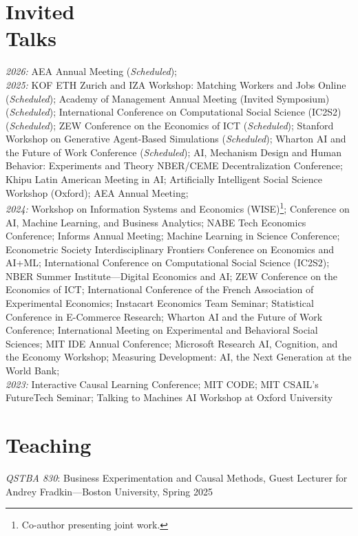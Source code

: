 \documentclass[margin,line,pifont,palatino,courier, 9pt]{res}
\begin{document}
\begin{resume}
\section{\sc Invited\\Talks}
\textit{2026:} 
AEA Annual Meeting (\textit{Scheduled});\vspace{2mm}\\
\textit{2025:} 
KOF ETH Zurich and IZA Workshop: Matching Workers and Jobs Online (\textit{Scheduled});
Academy of Management Annual Meeting (Invited Symposium) (\textit{Scheduled});
International Conference on Computational Social Science (IC2S2) (\textit{Scheduled});
ZEW Conference on the Economics of ICT (\textit{Scheduled});
Stanford Workshop on Generative Agent-Based Simulations (\textit{Scheduled});
Wharton AI and the Future of Work Conference (\textit{Scheduled});
AI, Mechanism Design and Human Behavior: Experiments and Theory NBER/CEME Decentralization Conference;
Khipu Latin American Meeting in AI;
Artificially Intelligent Social Science Workshop (Oxford);
AEA Annual Meeting;\vspace{2mm}\\
\textit{2024:} Workshop on Information Systems and Economics (WISE)\footnote{Co-author presenting joint work.};
Conference on AI, Machine Learning, and Business Analytics;
NABE Tech Economics Conference; 
Informs Annual Meeting\footnotemark[\value{footnote}];
Machine Learning in Science Conference;
Econometric Society Interdisciplinary Frontiers Conference on Economics and AI+ML; 
International Conference on Computational Social Science (IC2S2)\footnotemark[\value{footnote}];
NBER Summer Institute---Digital Economics and AI\footnotemark[\value{footnote}];
ZEW Conference on the Economics of ICT;
International Conference of the French Association of Experimental Economics;
Instacart Economics Team Seminar;
Statistical Conference in E-Commerce Research;
Wharton AI and the Future of Work Conference; 
International Meeting on Experimental and Behavioral Social Sciences;
MIT IDE Annual Conference; 
Microsoft Research AI, Cognition, and the Economy Workshop; 
Measuring Development: AI, the Next Generation at the World Bank; 
\vspace{2mm}\\
\textit{2023:} Interactive Causal Learning Conference; 
MIT CODE; 
MIT CSAIL's FutureTech Seminar;
Talking to Machines AI Workshop at Oxford University

\section{\sc Teaching}
\textit{QSTBA 830}: Business Experimentation and Causal Methods, Guest Lecturer for Andrey Fradkin---Boston University, Spring 2025


\end{resume}
\end{document}
